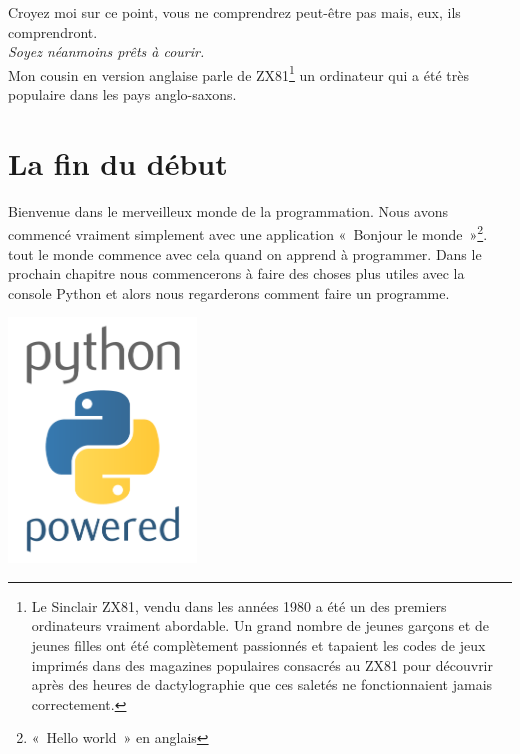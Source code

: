 Croyez moi sur ce point, vous ne comprendrez peut-être pas mais, eux, ils comprendront.\\

\emph{Soyez néanmoins prêts à courir.}\\


Mon cousin en version anglaise parle de ZX81\footnote{Le Sinclair ZX81, vendu dans les années 1980 a été un des premiers ordinateurs vraiment abordable. Un grand nombre de jeunes garçons et de jeunes filles ont été complètement passionnés et tapaient les codes de jeux imprimés dans des magazines populaires consacrés au ZX81 pour découvrir après des heures de dactylographie que ces saletés ne fonctionnaient jamais correctement.} un ordinateur qui a été très populaire dans les pays anglo-saxons.


\section*{La fin du début}

Bienvenue dans le merveilleux monde de la programmation. Nous avons commencé vraiment simplement avec une 
application «~Bonjour le monde~»\footnote{«~Hello world~» en anglais}. tout le monde commence avec cela quand on apprend à programmer. Dans le prochain chapitre nous commencerons à faire des choses plus utiles avec la console Python et alors nous regarderons comment faire un programme.

 \vfill
\begin{center}
 \includegraphics[width=5cm]{images/python.pdf}
\end{center}
 \vfill

\newpage
\thispagestyle{empty}
